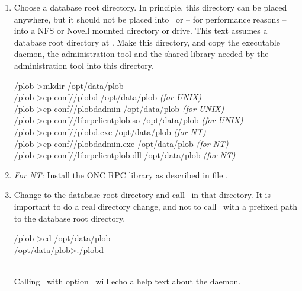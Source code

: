 \begin{enumerate}
\item Choose a database root directory. In principle, this directory
  can be placed anywhere, but it should not be placed into
  \ or -- for performance reasons -- into a NFS or Novell
  mounted directory or drive. This text assumes a database root
  directory at . Make this directory,
  and copy the executable daemon, the administration tool and the
  shared library needed by the administration tool into this
  directory.\\[\smallskipamount]
\begin{tt}\CodeSize
\td/plob-\thisversion>mkdir /opt/data/plob\\
\td/plob-\thisversion>cp conf/\shortosname/plobd /opt/data/plob
\hspace*{\fill}\textrm{\emph{(for UNIX)}}\\
\td/plob-\thisversion>cp conf/\shortosname/plobdadmin /opt/data/plob
\hspace*{\fill}\textrm{\emph{(for UNIX)}}\\
\td/plob-\thisversion>cp conf/\shortosname/librpclientplob.so /opt/data/plob
\hspace*{\fill}\textrm{\emph{(for UNIX)}}\\
\td/plob-\thisversion>cp conf/\shortosname/plobd.exe /opt/data/plob
\hspace*{\fill}\textrm{\emph{(for NT)}}\\
\td/plob-\thisversion>cp conf/\shortosname/plobdadmin.exe /opt/data/plob
\hspace*{\fill}\textrm{\emph{(for NT)}}\\
\td/plob-\thisversion>cp conf/\shortosname/librpclientplob.dll /opt/data/plob
\hspace*{\fill}\textrm{\emph{(for NT)}}
\end{tt}

\item \emph{For NT:} Install the ONC RPC library as described in file
\href{../oncrpc-1.12/doc/usage.htm}{}.

\item Change to the database root directory and call \ in
that directory. It is important to do a real directory change, and not
to call \ with a prefixed path to the database root
directory.\\[\smallskipamount]
\begin{tt}\CodeSize
\td/plob-\thisversion>cd /opt/data/plob\\
/opt/data/plob>./plobd
\end{tt}\\[\smallskipamount]
Calling \ with option \ will echo a help text
about the daemon.


\end{enumerate}
